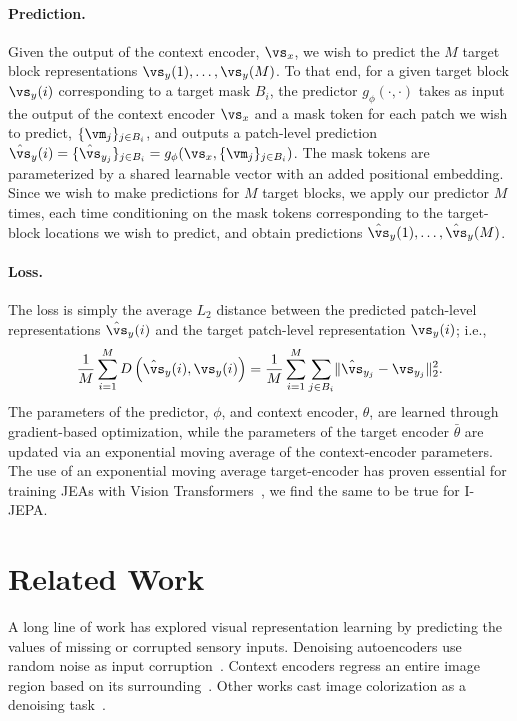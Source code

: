 \documentclass[10pt,twocolumn,letterpaper]{article}
\newcommand{\putalg}{{I-JEPA}\xspace}
\begin{document}
\paragraph{Prediction.}
Given the output of the context encoder, $\vs_x$, we wish to predict the $M$ target block representations $\vs_y(1), \ldots, \vs_y(M)$.
To that end, for a given target block $\vs_y(i)$ corresponding to a target mask $B_i$, the predictor $g_\phi(\cdot, \cdot)$ takes as input the output of the context encoder $\vs_x$ and a  mask token for each patch we wish to predict, $\{\vm_j\}_{j \in B_i}$, and outputs a patch-level prediction $\hat{\vs}_y(i)=\{\hat{\vs}_{y_j}\}_{j \in B_i} = g_\phi(\vs_x, \{\vm_j\}_{j \in B_i})$.
The mask tokens are parameterized by a shared learnable vector with an added positional embedding.
Since we wish to make predictions for $M$ target blocks, we apply our predictor $M$ times, each time conditioning on the mask tokens corresponding to the target-block locations we wish to predict, and obtain predictions $\hat{\vs}_y(1), \ldots, \hat{\vs}_y(M)$.

\paragraph{Loss.}
The loss is simply the average $L_2$ distance between the predicted patch-level representations $\hat{\vs}_y(i)$ and the target patch-level representation $\vs_y(i)$; i.e.,
\[
    \frac{1}{M} \sum^M_{i=1} {D}\left(\hat{\vs}_y(i), \vs_y(i)\right) = \frac{1}{M}  \sum^M_{i=1}\sum_{j \in B_i} \lVert\hat{\vs}_{y_j} - \vs_{y_j}\rVert^2_2.
\]
The parameters of the predictor, $\phi$, and context encoder, $\theta$, are learned through gradient-based optimization, while the parameters of the target encoder $\bar{\theta}$ are updated via an exponential moving average of the context-encoder parameters.
The use of an exponential moving average target-encoder has proven essential for training JEAs with Vision Transformers~\cite{chen2021empirical,zhou2021ibotyes,caron2021emerging}, we find the same to be true for \putalg.

\section{Related Work}
\label{sec:related_works}

A long line of work has explored visual representation learning by predicting the values of missing or corrupted sensory inputs.
Denoising autoencoders use random noise as input corruption~\cite{vincent2010stacked}.
Context encoders regress an entire image region based on its surrounding~\cite{pathak2016context}.
Other works cast image colorization as a denoising task~\cite{zhang2016colorful,larsson2016learning,larsson2017colorization}.
\end{document}
